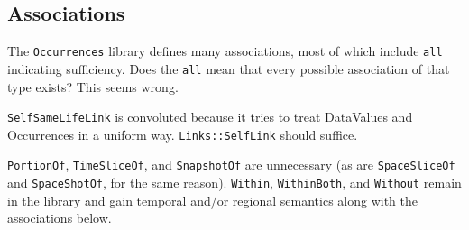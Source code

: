 

%
%

\subsection{Associations}\label{subsec:associations}

\pn The \texttt{Occurrences} library defines many associations, most of which include \texttt{all} indicating sufficiency.
Does the \texttt{all} mean that every possible association of that type exists?  This seems wrong.

\pn \texttt{SelfSameLifeLink} is convoluted because it tries to treat DataValues and Occurrences in a uniform way. 
\texttt{Links::SelfLink} should suffice.

\pn \texttt{PortionOf}, \texttt{TimeSliceOf}, and \texttt{SnapshotOf} are unnecessary (as are \texttt{SpaceSliceOf} and \texttt{SpaceShotOf}, for the same reason). \texttt{Within}, \texttt{WithinBoth}, and \texttt{Without} remain in the library and gain temporal and/or regional semantics along with the associations below.

